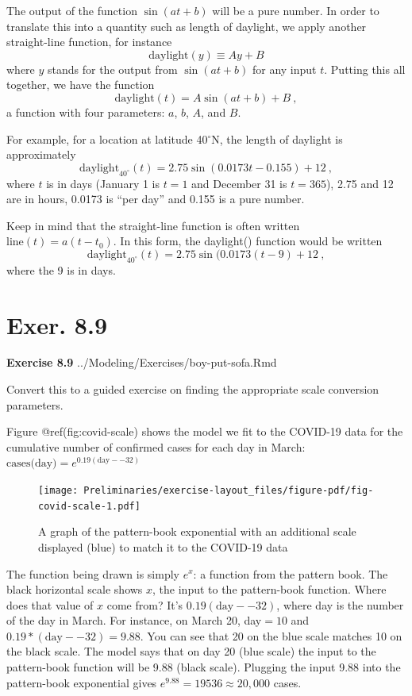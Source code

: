 \documentclass[
  letterpaper,
  DIV=11,
  numbers=noendperiod,
  oneside]{article}
\renewcommand{\line}{\text{line}}
\begin{document}
\begin{multicols}{2}
The output of the function \(\sin(a t + b)\) will be a pure number. In
order to translate this into a quantity such as length of daylight, we
apply another straight-line function, for instance
\[\text{daylight}(y) \equiv A y + B\] where \(y\) stands for the output
from \(\sin(a t + b)\) for any input \(t\). Putting this all together,
we have the function \[\text{daylight}(t) = A \sin(a t + b) + B\ ,\] a
function with four parameters: \(a\), \(b\), \(A\), and \(B\).

For example, for a location at latitude 40\(^\circ\)N, the length of
daylight is approximately
\[\text{daylight}_{40^\circ}(t) = 2.75 \sin(0.0173 t - 0.155) + 12\ ,\]
where \(t\) is in days (January 1 is \(t=1\) and December 31 is
\(t=365\)), 2.75 and 12 are in hours, 0.0173 is ``per day'' and 0.155 is
a pure number.

Keep in mind that the straight-line function is often written
\(\line(t) = a\left(t-t_0\right)\). In this form, the daylight()
function would be written
\[\text{daylight}_{40^\circ}(t) = 2.75 \sin(0.0173 \left(t - 9\right) + 12\ ,\]
where the 9 is in days.

\hypertarget{exer.-8.9}{%
\section*{Exer. 8.9}\label{exer.-8.9}}

\textbf{Exercise 8.9} ../Modeling/Exercises/boy-put-sofa.Rmd

Convert this to a guided exercise on finding the appropriate scale
conversion parameters.

Figure @ref(fig:covid-scale) shows the model we fit to the COVID-19 data
for the cumulative number of confirmed cases for each day in March:
\(\text{cases(day)} = e^{0.19(\text{day}- -32)}\)

\begin{figure}

{\centering \texttt{[image: Preliminaries/exercise-layout\_files/figure-pdf/fig-covid-scale-1.pdf]}

}

\caption{\label{fig-covid-scale}A graph of the pattern-book exponential
with an additional scale displayed (blue) to match it to the COVID-19
data}

\end{figure}

The function being drawn is simply \(e^x\): a function from the pattern
book. The black horizontal scale shows \(x\), the input to the
pattern-book function. Where does that value of \(x\) come from? It's
\(0.19(\text{day} - -32)\), where day is the number of the day in March.
For instance, on March 20, day\(=10\) and
\(0.19*(\text{day}- -32) = 9.88\). You can see that 20 on the blue scale
matches 10 on the black scale. The model says that on day 20 (blue
scale) the input to the pattern-book function will be 9.88 (black
scale). Plugging the input 9.88 into the pattern-book exponential gives
\(e^{9.88} = 19536 \approx 20,000\) cases.


\end{multicols}
\end{document}
